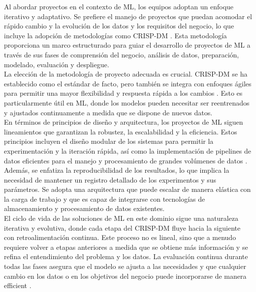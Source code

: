 \documentclass[journal]{IEEEtran}
\begin{document}
Al abordar proyectos en el contexto de ML, los equipos adoptan un enfoque iterativo y adaptativo. Se prefiere el manejo de proyectos que puedan acomodar el rápido cambio y la evolución de los datos y los requisitos del negocio, lo que incluye la adopción de metodologías como CRISP-DM \cite{datasciencepmWhatCRISP}. Esta metodología proporciona un marco estructurado para guiar el desarrollo de proyectos de ML a través de sus fases de comprensión del negocio, análisis de datos, preparación, modelado, evaluación y despliegue.\\

La elección de la metodología de proyecto adecuada es crucial. CRISP-DM se ha establecido como el estándar de facto, pero también se integra con enfoques ágiles para permitir una mayor flexibilidad y respuesta rápida a los cambios \cite{datasciencepmWhatCRISP}. Esto es particularmente útil en ML, donde los modelos pueden necesitar ser reentrenados y ajustados continuamente a medida que se dispone de nuevos datos.\\

En términos de principios de diseño y arquitectura, los proyectos de ML siguen lineamientos que garantizan la robustez, la escalabilidad y la eficiencia. Estos principios incluyen el diseño modular de los sistemas para permitir la experimentación y la iteración rápida, así como la implementación de pipelines de datos eficientes para el manejo y procesamiento de grandes volúmenes de datos \cite{10081336}. Además, se enfatiza la reproducibilidad de los resultados, lo que implica la necesidad de mantener un registro detallado de los experimentos y sus parámetros. Se adopta una arquitectura que puede escalar de manera elástica con la carga de trabajo y que es capaz de integrarse con tecnologías de almacenamiento y procesamiento de datos existentes.\\

El ciclo de vida de las soluciones de ML en este dominio sigue una naturaleza iterativa y evolutiva, donde cada etapa del CRISP-DM fluye hacia la siguiente con retroalimentación continua. Este proceso no es lineal, sino que a menudo requiere volver a etapas anteriores a medida que se obtiene más información y se refina el entendimiento del problema y los datos. La evaluación continua durante todas las fases asegura que el modelo se ajusta a las necesidades y que cualquier cambio en los datos o en los objetivos del negocio puede incorporarse de manera efficient \cite{10081336}.\\
\end{document}
